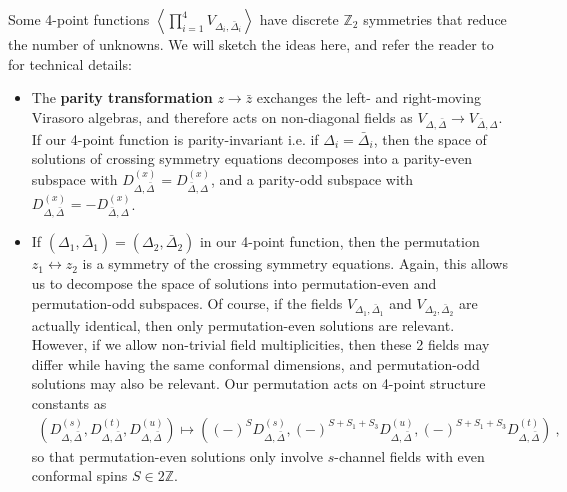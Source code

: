 \documentclass[12pt, a4paper]{article}
\newcommand{\myindex}[1]{\textbf{\boldmath #1}}
\theoremstyle{break}
\begin{document}
Some 4-point functions $\left<\prod_{i=1}^4 V_{\Delta_i,\bar\Delta_i}\right>$ have discrete $\mathbb{Z}_2$ symmetries that reduce the number of unknowns. We will sketch the ideas here, and refer the reader to \cite[Section 2.4]{nrj23} for technical details:
\begin{itemize}
 \item The \myindex{parity transformation} $z\to \bar z$ exchanges the left- and right-moving Virasoro algebras, and therefore acts on non-diagonal fields as $V_{\Delta,\bar\Delta}\to V_{\bar\Delta,\Delta}$. If our 4-point function is parity-invariant i.e. if $\Delta_i=\bar\Delta_i$, then the space of solutions of crossing symmetry equations decomposes into a parity-even subspace with $D^{(x)}_{\Delta,\bar\Delta}=D^{(x)}_{\bar\Delta,\Delta}$, and a parity-odd subspace with $D^{(x)}_{\Delta,\bar\Delta}=-D^{(x)}_{\bar\Delta,\Delta}$. 
 \item If $(\Delta_1,\bar\Delta_1)=(\Delta_2,\bar\Delta_2)$ in our 4-point function, then 
the permutation $z_1\leftrightarrow z_2$ is a symmetry of the crossing symmetry equations. Again, this allows us to decompose the space of solutions into permutation-even and permutation-odd subspaces. Of course, if the fields $V_{\Delta_1,\bar\Delta_1}$ and $V_{\Delta_2,\bar\Delta_2}$ are actually identical, then only permutation-even solutions are relevant. However, if we allow non-trivial field multiplicities, then these 2 fields may differ while having the same conformal dimensions, and permutation-odd solutions may also be relevant. 
Our permutation acts on 4-point structure constants as 
\begin{align}
\left(D^{(s)}_{\Delta,\bar\Delta},D^{(t)}_{\Delta,\bar\Delta},D^{(u)}_{\Delta,\bar\Delta}\right) \mapsto \left((-)^{S}D^{(s)}_{\Delta,\bar\Delta},(-)^{S+S_1+S_3}D^{(u)}_{\Delta,\bar\Delta},(-)^{S+S_1+S_3}D^{(t)}_{\Delta,\bar\Delta}\right)\ ,
\end{align}
so that permutation-even solutions only involve $s$-channel fields with even conformal spins $S\in 2\mathbb{Z}$. 
\end{itemize}
\end{document}
